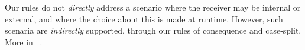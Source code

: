 %
%
%

 Our rules do  not \emph{directly} address a scenario where  the receiver may be
   internal or external, and where  the choice about this is made at runtime. 
However, such scenaria  are \emph{indirectly} supported, through our rules of consequence and  case-split.
More   in  \A\ .

